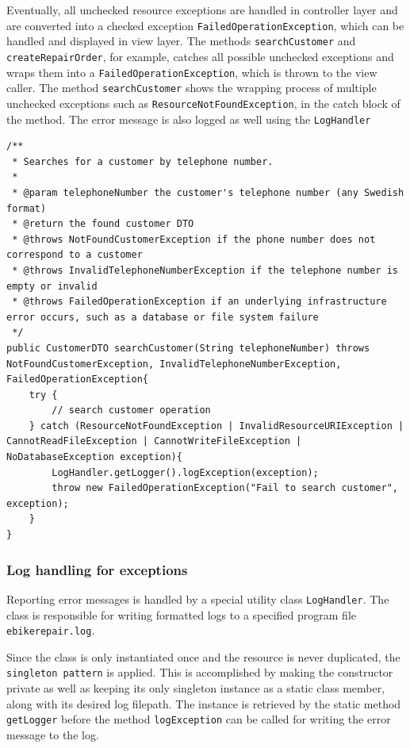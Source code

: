 \documentclass[a4paper]{scrartcl}
\begin{document}
Eventually, all unchecked resource exceptions are handled in controller layer and are converted into a checked exception \texttt{FailedOperationException}, which can be handled and displayed in view layer. The methods \texttt{searchCustomer} and \texttt{createRepairOrder}, for example, catches all possible unchecked exceptions and wraps them into a \texttt{FailedOperationException}, which is thrown to the view caller. The method \texttt{searchCustomer} shows the wrapping process of multiple unchecked exceptions such as \texttt{ResourceNotFoundException}, in the catch block of the method. The error message is also logged as well using the \texttt{LogHandler}

\begin{lstlisting}[style=javastyle, caption={ResourceNotFoundException wrapped to FailedOperationException}]
/**
 * Searches for a customer by telephone number.
 *
 * @param telephoneNumber the customer's telephone number (any Swedish format)
 * @return the found customer DTO
 * @throws NotFoundCustomerException if the phone number does not correspond to a customer
 * @throws InvalidTelephoneNumberException if the telephone number is empty or invalid
 * @throws FailedOperationException if an underlying infrastructure error occurs, such as a database or file system failure
 */
public CustomerDTO searchCustomer(String telephoneNumber) throws NotFoundCustomerException, InvalidTelephoneNumberException, FailedOperationException{
    try {
        // search customer operation
    } catch (ResourceNotFoundException | InvalidResourceURIException | CannotReadFileException | CannotWriteFileException | NoDatabaseException exception){
        LogHandler.getLogger().logException(exception);
        throw new FailedOperationException("Fail to search customer", exception);
    }
}
\end{lstlisting}

\subsubsection{Log handling for exceptions}

Reporting error messages is handled by a special utility class \texttt{LogHandler}. The class is responsible for writing formatted logs to a specified program file \texttt{ebikerepair.log}.

Since the class is only instantiated once and the resource is never duplicated, the \texttt{singleton pattern} is applied. This is accomplished by making the constructor private as well as keeping its only singleton instance as a static class member, along with its desired log filepath. The instance is retrieved by the static method \texttt{getLogger} before the method \texttt{logException} can be called for writing the error message to the log.  
\end{document}
